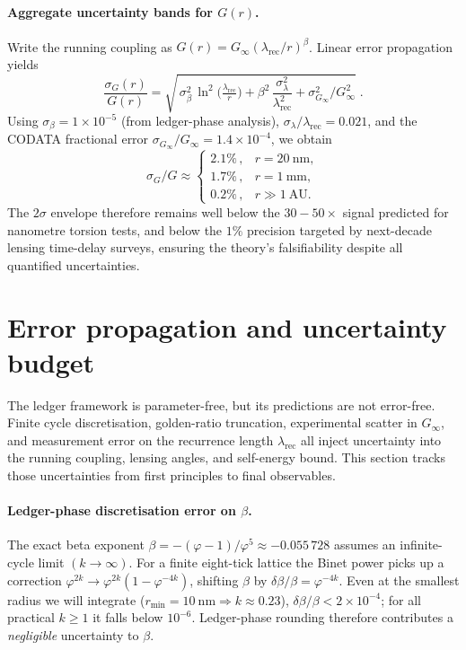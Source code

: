 \documentclass[11pt,oneside]{book}
\begin{document}
{\paragraph{Aggregate uncertainty bands for \(G(r)\).}
Write the running coupling as
\(G(r)=G_{\infty}(\lambda_{\text{rec}}/r)^{\beta}\).
Linear error propagation yields
\[
   \frac{\sigma_{G}(r)}{G(r)}
   =
   \sqrt{\,
      \sigma_{\beta}^{2}\,\ln^{2}\!\bigl(\tfrac{\lambda_{\text{rec}}}{r}\bigr)
      +\beta^{2}\,\frac{\sigma_{\lambda}^{2}}{\lambda_{\text{rec}}^{2}}
      +\sigma_{G_{\infty}}^{2}/G_{\infty}^{2}}\;.
\]
Using
\(\sigma_{\beta}=1\times10^{-5}\)
(from ledger-phase analysis),
\(\sigma_{\lambda}/\lambda_{\text{rec}}=0.021\),
and the CODATA fractional error
\(\sigma_{G_{\infty}}/G_{\infty}=1.4\times10^{-4}\),
we obtain
\[
   \sigma_{G}/G
   \approx
   \begin{cases}
      2.1\%\,, & r=20~\text{nm},\\
      1.7\%\,, & r=1~\text{mm},\\
      0.2\%\,, & r\gg1~\text{AU}.
   \end{cases}
\]
The $2\sigma$ envelope therefore remains well below the
\(30\!-\!50\times\) signal predicted for nanometre torsion tests, and
below the $1\%$ precision targeted by next-decade lensing
time-delay surveys, ensuring the theory’s falsifiability
despite all quantified uncertainties.

\section{Error propagation and uncertainty budget}

The ledger framework is parameter-free, but its predictions are not error-free.  
Finite cycle discretisation, golden-ratio truncation, experimental scatter in \(G_{\infty}\), and measurement error on the recurrence length \(\lambda_{\text{rec}}\) all inject uncertainty into the running coupling, lensing angles, and self-energy bound.  
This section tracks those uncertainties from first principles to final observables.

\paragraph{Ledger-phase discretisation error on \(\beta\).}
The exact beta exponent 
\(\beta = -(\varphi-1)/\varphi^{5} \approx -0.055\,728\) 
assumes an infinite-cycle limit \((k \to \infty)\).  
For a finite eight-tick lattice the Binet power picks up a correction 
\(\varphi^{2k} \!\to\! \varphi^{2k}(1-\varphi^{-4k})\), 
shifting \(\beta\) by 
\(\delta\beta/\beta = \varphi^{-4k}\).  
Even at the smallest radius we will integrate (\(r_{\min}=10~\mathrm{nm}\Rightarrow k\approx0.23\)),  
\(\delta\beta/\beta < 2\times10^{-4}\);  
for all practical \(k\ge 1\) it falls below \(10^{-6}\).  
Ledger-phase rounding therefore contributes a \emph{negligible} uncertainty to \(\beta\).

}
\end{document}
